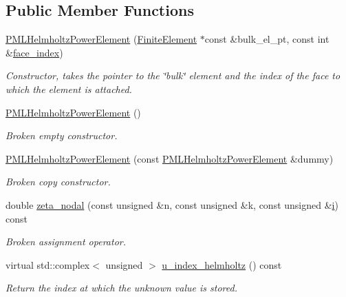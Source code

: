 \subsection*{Public Member Functions}
\begin{DoxyCompactItemize}
\item 
\hyperlink{classoomph_1_1PMLHelmholtzPowerElement_a5e54346ab4784c53fe22d8b7de1845d2}{P\+M\+L\+Helmholtz\+Power\+Element} (\hyperlink{classoomph_1_1FiniteElement}{Finite\+Element} $\ast$const \&bulk\+\_\+el\+\_\+pt, const int \&\hyperlink{classoomph_1_1FaceElement_a478d577ac6db67ecc80f1f02ae3ab170}{face\+\_\+index})
\begin{DoxyCompactList}\small\item\em Constructor, takes the pointer to the \char`\"{}bulk\char`\"{} element and the index of the face to which the element is attached. \end{DoxyCompactList}\item 
\hyperlink{classoomph_1_1PMLHelmholtzPowerElement_a84f1714b98197b3f22b5784cd682fb29}{P\+M\+L\+Helmholtz\+Power\+Element} ()
\begin{DoxyCompactList}\small\item\em Broken empty constructor. \end{DoxyCompactList}\item 
\hyperlink{classoomph_1_1PMLHelmholtzPowerElement_aa89255f6a11f16ee17121fc0bfa90ab0}{P\+M\+L\+Helmholtz\+Power\+Element} (const \hyperlink{classoomph_1_1PMLHelmholtzPowerElement}{P\+M\+L\+Helmholtz\+Power\+Element} \&dummy)
\begin{DoxyCompactList}\small\item\em Broken copy constructor. \end{DoxyCompactList}\item 
double \hyperlink{classoomph_1_1PMLHelmholtzPowerElement_a5ee9ddb45e780e47245fc31b7f38ba19}{zeta\+\_\+nodal} (const unsigned \&n, const unsigned \&k, const unsigned \&\hyperlink{cfortran_8h_adb50e893b86b3e55e751a42eab3cba82}{i}) const
\begin{DoxyCompactList}\small\item\em Broken assignment operator. \end{DoxyCompactList}\item 
virtual std\+::complex$<$ unsigned $>$ \hyperlink{classoomph_1_1PMLHelmholtzPowerElement_af9ede78a62532221a9a5b9ff90572a09}{u\+\_\+index\+\_\+helmholtz} () const
\begin{DoxyCompactList}\small\item\em Return the index at which the unknown value is stored. \end{DoxyCompactList}\item 

\end{DoxyCompactItemize}

